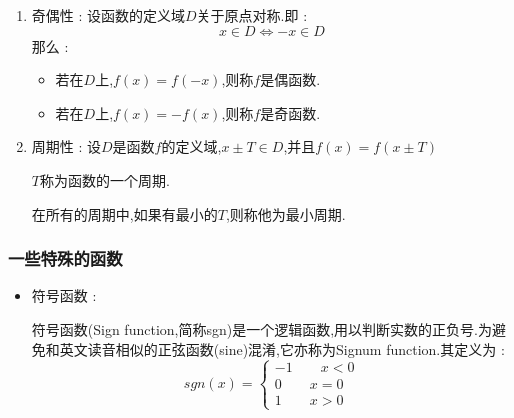 {{{\begin{enumerate}
{              若对于任意的$x_1,x_2 \in D,x_1 < x_2 \Leftrightarrow \defFunction{x_1} \leq \defFunction{x_2}$,则称函数$f$在$D$单调增加.如果$\leq$可以换成$<$,则称为严格单调增加.

              记为 : $$
                  f\uparrow(f\mbox{严格}\uparrow)
              $$

              类似的,将不等号的箭头方向改变,也有单调减少和严格单调减少,记为 : $$
                  f\downarrow(f\mbox{严格}\downarrow)
              $$
              }
        \item {
              奇偶性 : 设函数的定义域$D$关于原点对称.即 : $$
                  x \in D \Leftrightarrow -x \in D
              $$
              那么 :

              \begin{itemize}
                  \item 若在$D$上,$f(x) = f(-x)$,则称$f$是偶函数.
                  \item 若在$D$上,$f(x) = -f(x)$,则称$f$是奇函数.
              \end{itemize}
              }
        \item {
              周期性 : 设$D$是函数$f$的定义域,$x \pm T \in D$,并且$f(x) = f(x \pm T)$

              $T$称为函数的一个周期.

              在所有的周期中,如果有最小的$T$,则称他为最小周期.

              }
    \end{enumerate}
}%

\subsubsection{一些特殊的函数}{
    \begin{itemize}
        \item {
              符号函数 :

              符号函数(Sign function,简称sgn)是一个逻辑函数,用以判断实数的正负号.为避免和英文读音相似的正弦函数(sine)混淆,它亦称为Signum function.其定义为 : $$
                  sgn(x) = \begin{cases}
                      -1\qquad x < 0 \\
                      0\qquad x = 0  \\
                      1\qquad x > 0
                  \end{cases}
              $$


}
\end{itemize}}}}
